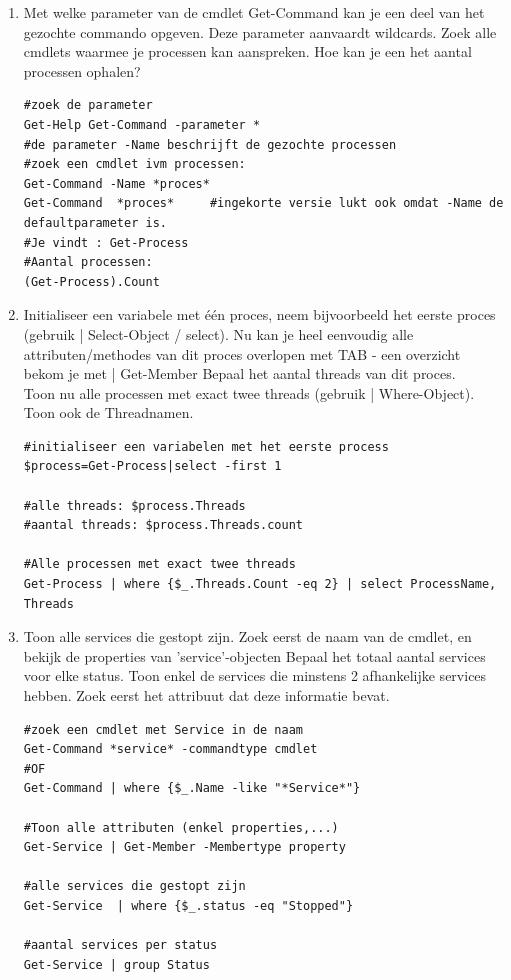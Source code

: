 \documentclass[11pt,a4paper]{report}
\begin{document}
\begin{enumerate}
	\item Met welke parameter van de cmdlet Get-Command kan je een deel van het gezochte commando opgeven. Deze parameter aanvaardt wildcards.
	Zoek alle cmdlets waarmee je processen kan aanspreken. Hoe kan je een het aantal processen ophalen?
	\begin{lstlisting}
#zoek de parameter
Get-Help Get-Command -parameter * 
#de parameter -Name beschrijft de gezochte processen
#zoek een cmdlet ivm processen:
Get-Command -Name *proces* 
Get-Command  *proces*     #ingekorte versie lukt ook omdat -Name de defaultparameter is.
#Je vindt : Get-Process
#Aantal processen:
(Get-Process).Count
	\end{lstlisting}
	\newpage
	\item Initialiseer een variabele met één proces, neem bijvoorbeeld het eerste proces (gebruik | Select-Object / select).
	Nu kan je heel eenvoudig alle attributen/methodes van dit proces overlopen met TAB - een overzicht bekom je met | Get-Member
	Bepaal het aantal threads van dit proces.
	\\Toon nu alle processen met exact twee threads (gebruik | Where-Object). Toon ook de Threadnamen.
	\begin{lstlisting}
#initialiseer een variabelen met het eerste process
$process=Get-Process|select -first 1

#alle threads: $process.Threads 
#aantal threads: $process.Threads.count

#Alle processen met exact twee threads
Get-Process | where {$_.Threads.Count -eq 2} | select ProcessName, Threads
	\end{lstlisting}
	\item Toon alle services die gestopt zijn. Zoek eerst de naam van de cmdlet, en bekijk de properties van 'service'-objecten
	Bepaal het totaal aantal services voor elke status.
	Toon enkel de services die minstens 2 afhankelijke services hebben. Zoek eerst het attribuut dat deze informatie bevat.
	\begin{lstlisting}
#zoek een cmdlet met Service in de naam
Get-Command *service* -commandtype cmdlet
#OF
Get-Command | where {$_.Name -like "*Service*"}

#Toon alle attributen (enkel properties,...)
Get-Service | Get-Member -Membertype property

#alle services die gestopt zijn
Get-Service  | where {$_.status -eq "Stopped"}

#aantal services per status
Get-Service | group Status


\end{lstlisting}
\end{enumerate}
\end{document}
